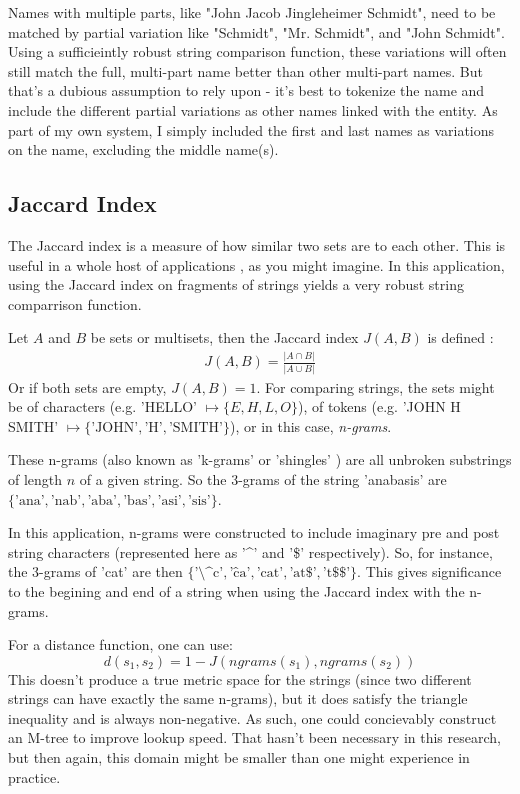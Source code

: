 \documentclass[11pt]{article}
\begin{document}
Names with multiple parts, like "John Jacob Jingleheimer Schmidt", need to be matched by
partial variation like "Schmidt", "Mr. Schmidt", and "John Schmidt". 
Using a sufficieintly robust string comparison function, these variations will often 
still match the full, multi-part name better than other multi-part names.
But that's a dubious assumption to rely upon - it's best to tokenize the name and
include the different partial variations as other names linked with the entity.
As part of my own system, I simply included the first and last names as variations on
the name, excluding the middle name(s).

\subsection{Jaccard Index}
The Jaccard index is a measure of how similar two sets are to each other.
This is useful in a whole host of applications \cite{general}, as you might imagine. 
In this application, using the Jaccard index on fragments of strings yields a very
robust string comparrison function.

Let $A$ and $B$ be sets or multisets, then the Jaccard index $J(A,B)$ is defined \cite{mining, comparison}:
\begin{align*}
    J(A, B) = \frac{\left| A \cap B \right|}{\left| A \cup B \right|}
\end{align*}
Or if both sets are empty, $J(A,B) = 1$.
For comparing strings, the sets might be of characters (e.g. 'HELLO' $\mapsto \{E, H, L, O\}$), 
of tokens (e.g. 'JOHN H SMITH' $\mapsto \{\text{'JOHN'}, \text{'H'}, \text{'SMITH'}\}$),
or in this case, {\em n-grams}.

These n-grams (also known as 'k-grams' or 'shingles' \cite{mining}) are all unbroken substrings of 
length $n$ of a given string. So the 3-grams of the string 'anabasis' are 
$\{\text{'ana'}, \text{'nab'}, \text{'aba'}, \text{'bas'}, \text{'asi'}, \text{'sis'}\}$. 

In this application, n-grams were constructed to include imaginary pre and post string characters
(represented here as '\^{}' and '\$' respectively). So, for instance, the 3-grams of 'cat' are then
$\{\text{'\^{}\^{}c'}, \text{'\^{}ca'}, \text{'cat'}, \text{'at\$'}, \text{'t\$\$'}\}$. This gives
significance to the begining and end of a string when using the Jaccard index with the n-grams.

For a distance function, one can use:
\[d(s_1,s_2) = 1-J(ngrams(s_1),ngrams(s_2))\]
This doesn't produce a true metric space for the strings
(since two different strings can have exactly the same n-grams), but it does satisfy
the triangle inequality \cite{general} and is always non-negative. As such, one could
concievably construct an M-tree \cite{mtree} to improve lookup speed. That hasn't been necessary
in this research, but then again, this domain might be smaller than one might experience in
practice.
\end{document}
